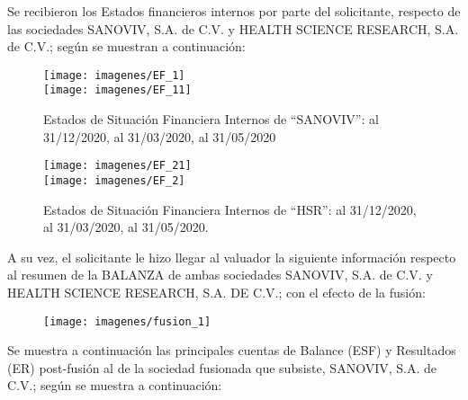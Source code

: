 Se recibieron los Estados financieros internos por parte del solicitante, respecto de las sociedades \textcolor{principal}{SANOVIV, S.A. de C.V.} y \textcolor{principal}{HEALTH SCIENCE RESEARCH, S.A. de C.V.}; seg\'un se muestran a continuaci\'on:

\begin{center}
\begin{minipage}{10cm}
\begin{figure}[H]
\centering
\caption{\textcolor{principal}{Estados de Situaci\'on Financiera Internos de ``SANOVIV'': al 31/12/2020, al 31/03/2020, al 31/05/2020}\label{fig:ESF}}

\texttt{[image: imagenes/EF\_1]}\\
\texttt{[image: imagenes/EF\_11]}\\[5pt]

\end{figure}
\end{minipage}
\end{center}

\begin{center}

\begin{minipage}{10cm}
\begin{figure}[H]
\centering
\caption{\textcolor{principal}{Estados de Situaci\'on Financiera Internos de ``HSR'': al 31/12/2020, al 31/03/2020, al 31/05/2020.}\label{fig:ESF_2}}

\texttt{[image: imagenes/EF\_21]}\\
\texttt{[image: imagenes/EF\_2]}\\[5pt]

\end{figure}
\end{minipage}
\end{center}

A su vez, el solicitante le hizo llegar al valuador la siguiente informaci\'on respecto al resumen de la BALANZA de ambas sociedades  \textcolor{principal}{SANOVIV, S.A. de C.V.} y \textcolor{principal}{HEALTH SCIENCE RESEARCH, S.A. DE C.V.}; con el efecto de la fusi\'on:

\begin{figure}[H]
\centering
\texttt{[image: imagenes/fusion\_1]}
\end{figure}

Se muestra a continuaci\'on las principales cuentas de Balance (ESF) y Resultados (ER) post-fusi\'on al \fechaValoresCorto de la sociedad fusionada que subsiste, \textcolor{principal}{SANOVIV, S.A. de C.V.}; seg\'un se muestra a continuaci\'on:

